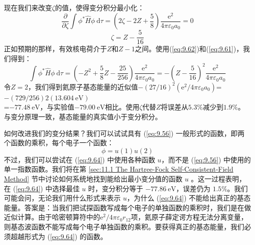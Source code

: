     现在我们来改变$\zeta$的值，使得变分积分最小化：
    \begin{equation*}
        \frac{\partial}{\partial \zeta} \int \phi^* \hat{H} \phi \: \mathrm{d}\tau = \left(2\zeta - 2Z + \frac{5}{8}\right)\frac{\mathrm{e}^2}{4\pi\varepsilon_0a_0} = 0
    \end{equation*}
    \begin{equation}
        \zeta = Z - \frac{5}{16}
        \label{eq:9.62}
    \end{equation}
    正如预期的那样，有效核电荷介于$Z$和$Z-1$之间。使用(\ref{eq:9.62})和(\ref{eq:9.61})，我们得到：
    \begin{equation}
        \int \phi^* \hat{H} \phi \: \mathrm{d}\tau = \left(-Z^2 + \frac{5}{8}Z - \frac{25}{256}\right)\frac{\mathrm{e}^2}{4\pi\varepsilon_0a_0} = -\left(Z - \frac{5}{16}\right)^2\frac{\mathrm{e}^2}{4\pi\varepsilon_0a_0}
        \label{eq:9.63}
    \end{equation}
    令$Z=2$，我们得到氦原子基态能量的近似值$-\left(27/16\right)^2\left(\mathrm{e}^2 / 4\pi\varepsilon_0a_0\right)$=$-\left(729/256\right)2\left(13.604 \: \mathrm{eV}\right)$\\=$-77.48 \: \mathrm{eV}$，与实验值$-79.00 \: \mathrm{eV}$相比。使用$\zeta$代替$Z$将误差从$5.3\%$减少到$1.9\%$。与变分原理一致，基态能量的真实值小于变分积分。


    如何改进我们的变分结果？我们可以试试具有 (\ref{eq:9.56}) 一般形式的函数，即两个函数的乘积，每个电子一个函数：
    \begin{equation}
        \phi = u\left(1\right)u\left(2\right)
        \label{eq:9.64}
    \end{equation}
    不过，我们可以尝试在 (\ref{eq:9.64}) 中使用各种函数 $u$，而不是 (\ref{eq:9.56}) 中使用的单一指数函数。我们将在第 \ref{sec:11.1 The Hartree-Fock Self-Consistent-Field Method} 节中讨论如何系统地找到能给出最小变分值的函数 $u$ 。这一过程表明，在 (\ref{eq:9.64}) 中选择最佳 $u$ 时，变分积分等于 $-77.86 \:\mathrm{eV}$，误差仍为 $1.5\%$。我们可能会问，无论我们用什么形式来表示 $u$，为什么 (\ref{eq:9.64}) 不能给出真正的基态能量。答案是：当我们把试探函数写成每个电子的单独函数的乘积时，我们是在做近似计算。由于哈密顿算符中的$\mathrm{e}^2 / 4\pi\varepsilon_0r_{12}$项，氦原子薛定谔方程无法分离变量，则基态波函数不能写成每个电子单独函数的乘积。要获得真正的基态能量，我们必须超越形式为 (\ref{eq:9.64}) 的函数。

